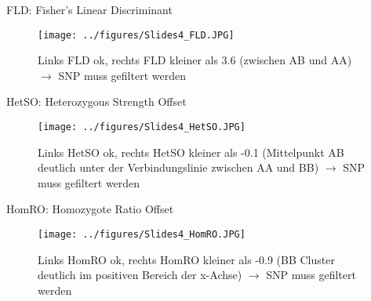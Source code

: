 \documentclass{beamer}
\begin{document}
\begin{frame}{FLD: Fisher’s Linear Discriminant}
\begin{figure}
    \centering
    \texttt{[image: ../figures/Slides4\_FLD.JPG]}
    \caption{Links FLD ok, rechts FLD kleiner als 3.6 (zwischen AB und AA) $\rightarrow$ SNP muss gefiltert werden}
    \label{fig:FLD}
\end{figure}
\end{frame}

\begin{frame}{HetSO: Heterozygous Strength Offset}
\begin{figure}
    \centering
    \texttt{[image: ../figures/Slides4\_HetSO.JPG]}
    \caption{Links HetSO ok, rechts HetSO kleiner als -0.1 (Mittelpunkt AB deutlich unter der Verbindungslinie zwischen AA und BB) $\rightarrow$ SNP muss gefiltert werden}
    \label{fig:HetSO}
\end{figure}
\end{frame}

\begin{frame}{HomRO: Homozygote Ratio Offset}
\begin{figure}
    \centering
    \texttt{[image: ../figures/Slides4\_HomRO.JPG]}
    \caption{Links HomRO ok, rechts HomRO kleiner als -0.9 (BB Cluster deutlich im positiven Bereich der x-Achse) $\rightarrow$ SNP muss gefiltert werden}
    \label{fig:HomRO}
\end{figure}
\end{frame}
\end{document}
